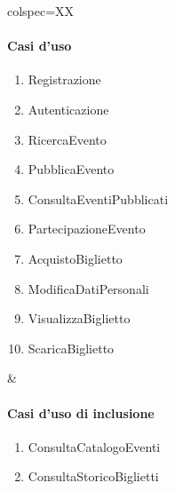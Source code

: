 \begin{table}[!hbp]
	\centering
	\begin{tblr}{colspec=XX}
		\begin{minipage}[t]{\linewidth}
			\paragraph{Casi d'uso}
			\begin{enumerate}[leftmargin=*]
				\item Registrazione 
				\item Autenticazione
				\item RicercaEvento
				\item PubblicaEvento
				\item ConsultaEventiPubblicati
				\item PartecipazioneEvento
				\item AcquistoBiglietto
				\item ModificaDatiPersonali
				\item VisualizzaBiglietto
				\item ScaricaBiglietto
			\end{enumerate}
		\end{minipage} &
		\begin{minipage}[t]{\linewidth}
			\paragraph{Casi d'uso di inclusione}
			\begin{enumerate}[leftmargin=*, start=11]
                \item ConsultaCatalogoEventi
	      		\item ConsultaStoricoBiglietti
			\end{enumerate}

		\end{minipage}
	\end{tblr}
\end{table}
